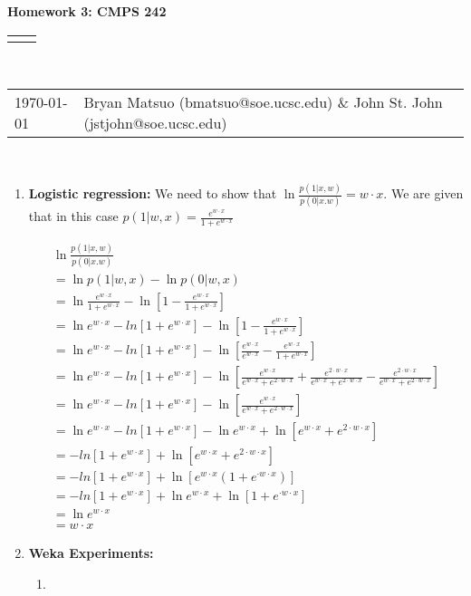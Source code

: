 \documentclass[12pt]{article}
\renewcommand{\title}[1]{\textbf{#1}\\}
\renewcommand{\line}{\begin{tabularx}{\textwidth}{X>{\raggedleft}X}\hline\\\end{tabularx}\\[-0.5cm]}
\newcommand{\leftright}[2]{\begin{tabularx}{\textwidth}{X>{\raggedleft}X}#1%
& #2\\\end{tabularx}\\[-0.5cm]}
\begin{document}
\title{Homework 3: CMPS 242}
\line
\leftright{\today}{Bryan Matsuo (bmatsuo@soe.ucsc.edu) \& John St. John (jstjohn@soe.ucsc.edu)} %
\begin{enumerate}
\item \textbf{Logistic regression:}
We need to show that $\ln \frac{p(1|x,w)}{p(0|x.w)}=w\cdot x$. We are given that in this case $p(1|w,x) = \frac{e^{w\cdot x}}{1+e^{w \cdot x}}$

\begin{eqnarray*}
\ln \frac{p(1|x,w)}{p(0|x.w)} \\
= \ln p(1|w,x) - \ln p(0|w,x) \\
=  \ln \frac{e^{w\cdot x}}{1+e^{w \cdot x}} - \ln \left[ 1-\frac{e^{w\cdot x}}{1+e^{w \cdot x}}\right] \\
=\ln e^{w\cdot x} - ln \left[ 1 + e^{w\cdot x} \right] -\ln \left[ 1-\frac{e^{w\cdot x}}{1+e^{w \cdot x}}\right] \\
=\ln e^{w\cdot x} - ln \left[ 1 + e^{w\cdot x} \right] -\ln \left[ \frac{e^{w\cdot x}}{e^{w\cdot x}}-\frac{e^{w\cdot x}}{1+e^{w \cdot x}}\right] \\
=\ln e^{w\cdot x} - ln \left[ 1 + e^{w\cdot x} \right] -\ln \left[ \frac{e^{w\cdot x}}{e^{w\cdot x}+e^{2\cdot w\cdot x}}+ \frac{e^{2\cdot w\cdot x}}{e^{w\cdot x}+e^{2\cdot w\cdot x}}-\frac{e^{2\cdot w\cdot x}}{e^{w\cdot x}+e^{2\cdot w\cdot x}}\right] \\
=\ln e^{w\cdot x} - ln \left[ 1 + e^{w\cdot x} \right] -\ln \left[ \frac{e^{w\cdot x}}{e^{w\cdot x}+e^{2\cdot w\cdot x}}\right] \\
=\ln e^{w\cdot x} - ln \left[ 1 + e^{w\cdot x} \right] -\ln e^{w\cdot x} + \ln \left[ e^{w\cdot x}+e^{2\cdot w\cdot x} \right] \\
= - ln \left[ 1 + e^{w\cdot x} \right] +  \ln \left[ e^{w\cdot x}+e^{2\cdot w\cdot x} \right] \\
= - ln \left[ 1 + e^{w\cdot x} \right] + \ln \left[ e^{w\cdot x}\left(1+e^{\cdot w\cdot x}\right) \right]\\
= - ln \left[ 1 + e^{w\cdot x} \right] + \ln e^{w\cdot x} + \ln \left[1+e^{\cdot w\cdot x}\right] \\
=\ln e^{w\cdot x}\\
= w\cdot x
\end{eqnarray*}


\item \textbf{Weka Experiments: }

\begin{enumerate}
\item 
\end{enumerate}
\end{enumerate}
\end{document}
